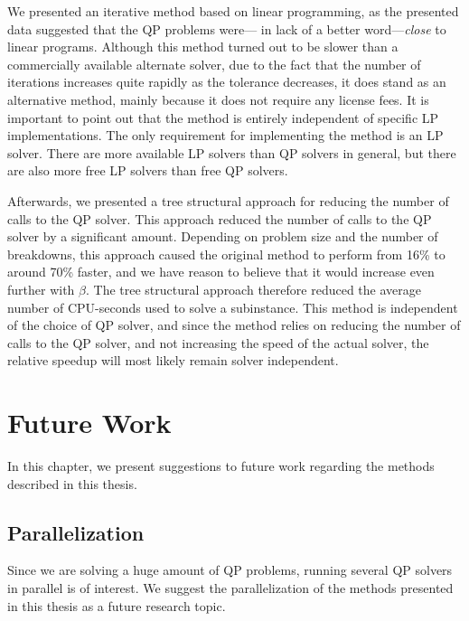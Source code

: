 \documentclass[a4paper,12pt]{report}
\begin{document}
We presented an iterative method based on linear programming, as the
presented data suggested that the QP problems were--- in lack of a better
word---\emph{close} to linear programs. Although this method turned out to be
slower than a commercially available alternate solver, due to the fact that the
number of iterations increases quite rapidly as the tolerance decreases, it
does stand as an alternative method, mainly because it does not require
any license fees.
It is important
to point out that the method is entirely independent of specific LP
implementations. The only requirement for implementing the method is an LP
solver. There are more available LP solvers than QP solvers in general,
but there are also more free LP solvers than free QP
solvers\cite{wikilp}\cite{wikiqp}.

Afterwards, we presented a tree structural approach for reducing the number
of calls to the QP solver. This approach reduced the number of calls to the
QP solver by a significant amount. Depending on problem size and the number
of breakdowns, this approach caused the original method to perform from
16\% to around 70\% faster, and we have reason to believe that it would
increase even further with $\beta$.
The tree structural approach therefore reduced the average number of
CPU-seconds used to solve a subinstance.
This method is
independent of the choice of QP solver, and since the method relies on reducing
the number of calls to the QP solver, and not increasing the speed of the
actual solver, the relative speedup will most likely remain solver independent.

\chapter{Future Work}
In this chapter, we present suggestions to future work regarding the methods
described in this thesis.

\section{Parallelization}
Since we are solving a huge amount of QP problems, running several QP solvers
in parallel is of interest. We suggest the parallelization of the methods
presented in this thesis as a future research topic.

\end{document}
